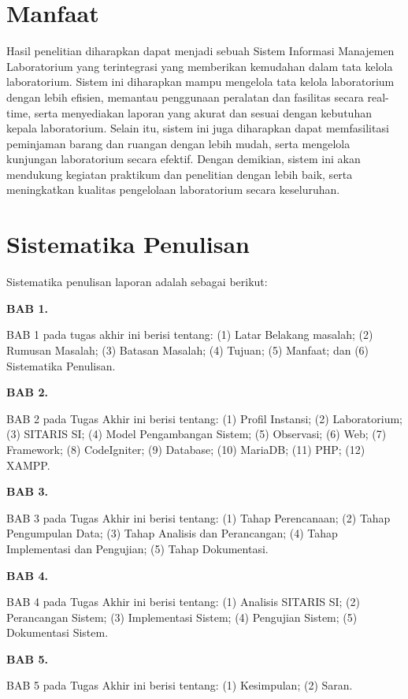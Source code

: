 \section{Manfaat}
Hasil penelitian diharapkan dapat menjadi sebuah Sistem Informasi Manajemen Laboratorium yang terintegrasi yang memberikan kemudahan dalam tata kelola laboratorium. Sistem ini diharapkan mampu mengelola tata kelola laboratorium dengan lebih efisien, memantau penggunaan peralatan dan fasilitas secara real-time, serta menyediakan laporan yang akurat dan sesuai dengan kebutuhan kepala laboratorium. Selain itu, sistem ini juga diharapkan dapat memfasilitasi peminjaman barang dan ruangan dengan lebih mudah, serta mengelola kunjungan laboratorium secara efektif. Dengan demikian, sistem ini akan mendukung kegiatan praktikum dan penelitian dengan lebih baik, serta meningkatkan kualitas pengelolaan laboratorium secara keseluruhan.
\section{Sistematika Penulisan}
Sistematika penulisan laporan adalah sebagai berikut:

\textbf{BAB 1. \babSatu}

BAB 1 pada tugas akhir ini berisi tentang: (1) Latar Belakang masalah; (2) Rumusan Masalah; (3) Batasan Masalah; (4) Tujuan; (5) Manfaat; dan (6) Sistematika Penulisan.

\textbf{BAB 2. \babDua}

BAB 2 pada Tugas Akhir ini berisi tentang: (1) Profil Instansi; (2) Laboratorium; (3) SITARIS SI; (4) Model Pengambangan Sistem; (5) Observasi; (6) Web; (7) Framework; (8) CodeIgniter; (9) Database; (10) MariaDB; (11) PHP; (12) XAMPP.

\textbf{BAB 3. \babTiga}

BAB 3 pada Tugas Akhir ini berisi tentang: (1) Tahap Perencanaan; (2) Tahap Pengumpulan Data; (3) Tahap Analisis dan Perancangan; (4) Tahap Implementasi dan Pengujian; (5) Tahap Dokumentasi.

\textbf{BAB 4. \babEmpat}

BAB 4 pada Tugas Akhir ini berisi tentang: (1) Analisis SITARIS SI; (2) Perancangan Sistem; (3) Implementasi Sistem; (4) Pengujian Sistem; (5) Dokumentasi Sistem.

\textbf{BAB 5. \babLima}

BAB 5 pada Tugas Akhir ini berisi tentang: (1) Kesimpulan; (2) Saran.
